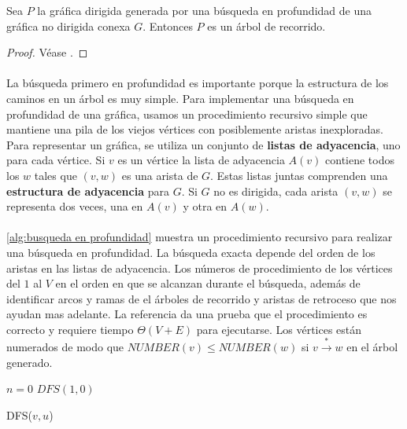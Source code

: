 \begin{lemma}
Sea $P$ la gráfica dirigida generada por una búsqueda en profundidad de una gráfica no dirigida conexa $G$. Entonces $P$ es un árbol de recorrido.
\label{lema:3.3}
\end{lemma}

\begin{proof}
Véase \citep{4569669}.
\end{proof}

\paragraph{}
La búsqueda primero en profundidad es importante porque la estructura de los caminos en un árbol es muy simple. Para implementar una búsqueda en profundidad de una gráfica, usamos un procedimiento recursivo simple que mantiene una pila de los viejos vértices con posiblemente aristas inexploradas. Para representar un gráfica, se utiliza un conjunto de \textbf{listas de adyacencia}, uno para cada vértice. Si $v$ es un vértice la lista de adyacencia $A\left(v\right)$ contiene todos los $w$ tales que $\left(v, w\right)$ es una arista de $G$. Estas listas juntas comprenden una \textbf{estructura de adyacencia} para $G$. Si $G$ no es dirigida, cada arista $\left(v, w\right)$ se representa dos veces, una en $A\left(v\right)$ y otra en $A\left(w\right)$. 

\paragraph{}
\ref{alg:busqueda en profundidad} muestra un procedimiento recursivo para realizar una búsqueda en profundidad. La búsqueda exacta depende del orden de los aristas en las listas de adyacencia. Los números de procedimiento de los vértices del $1$ al $V$ en el orden en que se alcanzan durante el búsqueda, además de identificar arcos y ramas de el árboles de recorrido y aristas de retroceso que nos ayudan mas adelante. La referencia \citep{4569669} da una prueba que el procedimiento es correcto y requiere tiempo $\Theta \left(V + E\right)$ para ejecutarse. Los vértices están numerados de modo que $NUMBER\left(v\right) \le NUMBER\left(w\right)$ si $ v \overset{\ast}{\rightarrow} w$ en el árbol generado.


\begin{algorithm}[!ht]
\DontPrintSemicolon
{}\;
\DontPrintSemicolon
$n=0$\;
$DFS(1, 0)$\;
\caption{DFS($v, u$)}\label{alg:busqueda en profundidad}
\end{algorithm}

